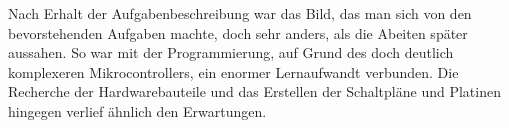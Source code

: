 Nach Erhalt der Aufgabenbeschreibung war das Bild, das man sich von den bevorstehenden Aufgaben machte, doch sehr anders, als die Abeiten später aussahen. So war mit der Programmierung, auf Grund des doch deutlich komplexeren Mikrocontrollers, ein enormer Lernaufwandt verbunden. Die Recherche der Hardwarebauteile und das Erstellen der Schaltpläne und Platinen hingegen verlief ähnlich den Erwartungen.
